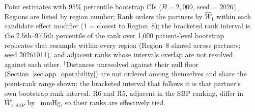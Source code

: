 \documentclass[AMA,Times1COL]{WileyNJDv5}
\begin{document}
\begin{table}[ht]
\centering
\caption{Per-effect-modifier Wasserstein-1 distance $\widehat{W}_1$ in original variable units (years for age, mmHg for SBP) with 95\% percentile bootstrap CIs for Region~8 versus each partner region (GUSTO-I), listed by region number, with each partner's rank by $\widehat{W}_1$ within each candidate effect modifier.\label{tab:gusto_nabcd}}
\begin{tablenotes}
\item Point estimates with 95\% percentile bootstrap CIs ($B = 2{,}000$, seed = 2026). Regions are listed by region number; Rank orders the partners by $\widehat{W}_1$ within each candidate effect modifier (1 = closest to Region~8); the bracketed rank interval is the 2.5th--97.5th percentile of the rank over 1{,}000 patient-level bootstrap replicates that resample within every region (Region~8 shared across partners; seed 20261011), and adjacent ranks whose intervals overlap are not resolved against each other. $^\dagger$Distances unresolved against their null floor (Section~\ref{sec:app_operability}) are not ordered among themselves and share the point-rank range shown; the bracketed interval that follows it is that partner's own bootstrap rank interval. R6 and R5, adjacent in the SBP ranking, differ in $\widehat{W}_{1,\text{SBP}}$ by ~mmHg, so their ranks are effectively tied.%
\end{tablenotes}
\end{table}


\end{document}
